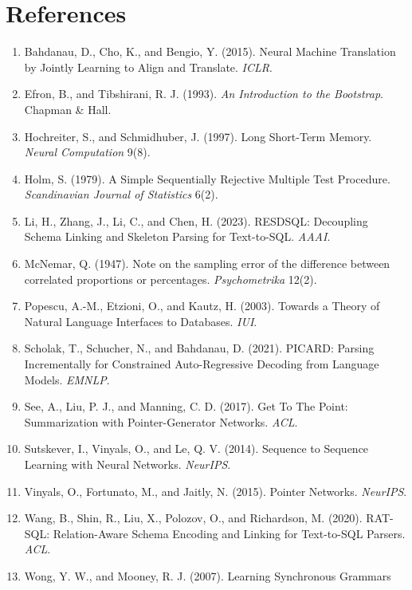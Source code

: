 \documentclass[
  10pt,
]{article}
\providecommand{\tightlist}{%
  \setlength{\itemsep}{0pt}\setlength{\parskip}{0pt}}
\begin{document}
\section*{References}\label{references}

\begin{enumerate}
\def\labelenumi{\arabic{enumi}.}
\tightlist
\item
  Bahdanau, D., Cho, K., and Bengio, Y. (2015). Neural Machine
  Translation by Jointly Learning to Align and Translate. \emph{ICLR}.
\item
  Efron, B., and Tibshirani, R. J. (1993). \emph{An Introduction to the
  Bootstrap}. Chapman \& Hall.
\item
  Hochreiter, S., and Schmidhuber, J. (1997). Long Short-Term Memory.
  \emph{Neural Computation} 9(8).
\item
  Holm, S. (1979). A Simple Sequentially Rejective Multiple Test
  Procedure. \emph{Scandinavian Journal of Statistics} 6(2).
\item
  Li, H., Zhang, J., Li, C., and Chen, H. (2023). RESDSQL: Decoupling
  Schema Linking and Skeleton Parsing for Text-to-SQL. \emph{AAAI}.
\item
  McNemar, Q. (1947). Note on the sampling error of the difference
  between correlated proportions or percentages. \emph{Psychometrika}
  12(2).
\item
  Popescu, A.-M., Etzioni, O., and Kautz, H. (2003). Towards a Theory of
  Natural Language Interfaces to Databases. \emph{IUI}.
\item
  Scholak, T., Schucher, N., and Bahdanau, D. (2021). PICARD: Parsing
  Incrementally for Constrained Auto-Regressive Decoding from Language
  Models. \emph{EMNLP}.
\item
  See, A., Liu, P. J., and Manning, C. D. (2017). Get To The Point:
  Summarization with Pointer-Generator Networks. \emph{ACL}.
\item
  Sutskever, I., Vinyals, O., and Le, Q. V. (2014). Sequence to Sequence
  Learning with Neural Networks. \emph{NeurIPS}.
\item
  Vinyals, O., Fortunato, M., and Jaitly, N. (2015). Pointer Networks.
  \emph{NeurIPS}.
\item
  Wang, B., Shin, R., Liu, X., Polozov, O., and Richardson, M. (2020).
  RAT-SQL: Relation-Aware Schema Encoding and Linking for Text-to-SQL
  Parsers. \emph{ACL}.
\item
  Wong, Y. W., and Mooney, R. J. (2007). Learning Synchronous Grammars

\end{enumerate}
\end{document}
